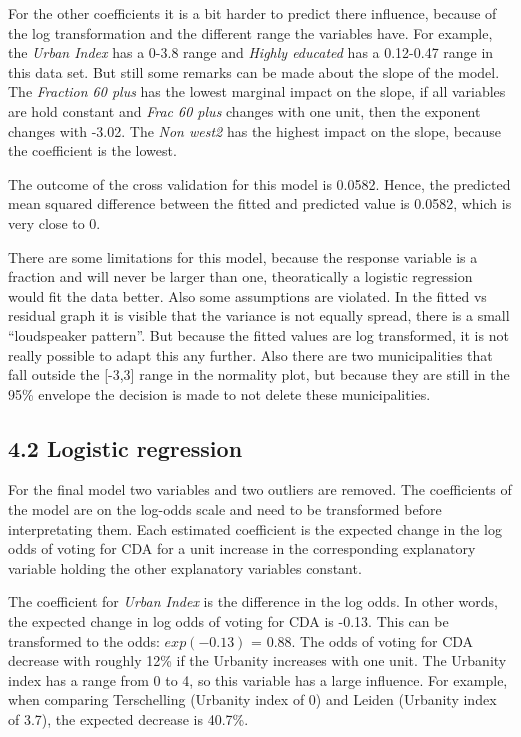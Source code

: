 \documentclass[11pt,]{article}
\begin{document}
For the other coefficients it is a bit harder to predict there
influence, because of the log transformation and the different range the
variables have. For example, the \emph{Urban Index} has a 0-3.8 range
and \emph{Highly educated} has a 0.12-0.47 range in this data set. But
still some remarks can be made about the slope of the model. The
\emph{Fraction 60 plus} has the lowest marginal impact on the slope, if
all variables are hold constant and \emph{Frac 60 plus} changes with one
unit, then the exponent changes with -3.02. The \emph{Non west2} has the
highest impact on the slope, because the coefficient is the lowest.

The outcome of the cross validation for this model is 0.0582. Hence, the
predicted mean squared difference between the fitted and predicted value
is 0.0582, which is very close to 0.

There are some limitations for this model, because the response variable
is a fraction and will never be larger than one, theoratically a
logistic regression would fit the data better. Also some assumptions are
violated. In the fitted vs residual graph it is visible that the
variance is not equally spread, there is a small ``loudspeaker
pattern''. But because the fitted values are log transformed, it is not
really possible to adapt this any further. Also there are two
municipalities that fall outside the {[}-3,3{]} range in the normality
plot, but because they are still in the 95\% envelope the decision is
made to not delete these municipalities.

\subsection{4.2 Logistic regression}\label{logistic-regression-1}

For the final model two variables and two outliers are removed. The
coefficients of the model are on the log-odds scale and need to be
transformed before interpretating them. Each estimated coefficient is
the expected change in the log odds of voting for CDA for a unit
increase in the corresponding explanatory variable holding the other
explanatory variables constant.

The coefficient for \emph{Urban Index} is the difference in the log
odds. In other words, the expected change in log odds of voting for CDA
is -0.13. This can be transformed to the odds: \(exp(-0.13)\) = 0.88.
The odds of voting for CDA decrease with roughly 12\% if the Urbanity
increases with one unit. The Urbanity index has a range from 0 to 4, so
this variable has a large influence. For example, when comparing
Terschelling (Urbanity index of 0) and Leiden (Urbanity index of 3.7),
the expected decrease is 40.7\%.
\end{document}
